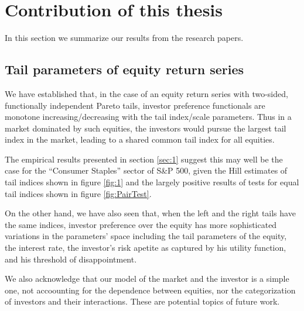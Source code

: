 \section{Contribution of this thesis}\label{sec:contr}

In this section we summarize our results from the research papers.

\subsection{Tail parameters of equity return series}
We have established that, in the case of an equity return series with
two-sided, functionally independent Pareto tails, investor
preference functionals are monotone increasing/decreasing with the
tail index/scale parameters. Thus in a market dominated by such
equities, the investors would pursue the largest tail index in the
market, leading to a shared common tail index for all equities.

The empirical results presented in section \ref{sec:1} suggest this
may well be the case for the ``Consumer Staples'' sector of S\&P 500,
given the Hill estimates of tail indices shown in figure \ref{fig:1}
and the largely positive results of tests for equal tail indices shown
in figure \ref{fig:PairTest}.

On the other hand, we have also seen that, when the left and the right
tails have the same indices, investor preference over the equity has
more sophisticated variations in the parameters' space including the
tail parameters of the equity, the interest rate, the investor's risk
apetite as captured by his utility function, and his threshold of
disappointment.

We also acknowledge that our model of the market and the investor is a
simple one, not accoounting for the dependence between equities, nor
the categorization of investors and their interactions. These are
potential topics of future work.

